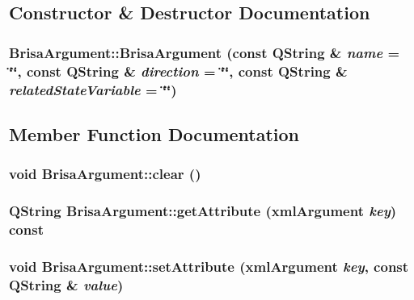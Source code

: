 \subsection{Constructor \& Destructor Documentation}
\hypertarget{classBrisaUpnp_1_1BrisaArgument_aeee47b38f9dd191543a00c7c52622b43}{
\subsubsection[{BrisaArgument}]{\setlength{\rightskip}{0pt plus 5cm}BrisaArgument::BrisaArgument (const QString \& {\em name} = {\ttfamily \char`\"{}\char`\"{}}, \/  const QString \& {\em direction} = {\ttfamily \char`\"{}\char`\"{}}, \/  const QString \& {\em relatedStateVariable} = {\ttfamily \char`\"{}\char`\"{}})}}
\label{classBrisaUpnp_1_1BrisaArgument_aeee47b38f9dd191543a00c7c52622b43}


\subsection{Member Function Documentation}
\hypertarget{classBrisaUpnp_1_1BrisaArgument_aa8f2c578c82ee25bf319c417ffe12c9a}{
\subsubsection[{clear}]{\setlength{\rightskip}{0pt plus 5cm}void BrisaArgument::clear ()}}
\label{classBrisaUpnp_1_1BrisaArgument_aa8f2c578c82ee25bf319c417ffe12c9a}
\hypertarget{classBrisaUpnp_1_1BrisaArgument_a5090d2b5a50c207478094ab34bf2b7b4}{
\subsubsection[{getAttribute}]{\setlength{\rightskip}{0pt plus 5cm}QString BrisaArgument::getAttribute ({\bf xmlArgument} {\em key}) const}}
\label{classBrisaUpnp_1_1BrisaArgument_a5090d2b5a50c207478094ab34bf2b7b4}
\hypertarget{classBrisaUpnp_1_1BrisaArgument_af24c372283313226cedd5a516f1162b0}{
\subsubsection[{setAttribute}]{\setlength{\rightskip}{0pt plus 5cm}void BrisaArgument::setAttribute ({\bf xmlArgument} {\em key}, \/  const QString \& {\em value})}}
\label{classBrisaUpnp_1_1BrisaArgument_af24c372283313226cedd5a516f1162b0}


